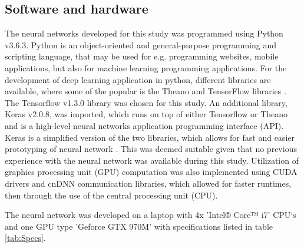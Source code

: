 \subsection{Software and hardware}\label{sec:softHard}
The neural networks developed for this study was programmed using Python v3.6.3. Python is an object-oriented and general-purpose programming and scripting language, that may be used for e.g. programming websites, mobile applications, but also for machine learning programming applications.
For the development of deep learning application in python, different libraries are available, where some of the popular is the Theano and TensorFlow libraries \citep{Swamynathan2017}. The Tensorflow v1.3.0 library was chosen for this study. %
An additional library, Keras v2.0.8, was imported, which runs on top of either Tensorflow or Theano and is a high-level neural networks application programming interface (API).  
Keras is a simplified version of the two libraries, which allows for fast and easier prototyping of neural network \citep{Chollet2015}. This was deemed suitable given that no previous experience with the neural network was available during this study. 
\noindent
Utilization of graphics processing unit (GPU) computation was also implemented using CUDA drivers and cnDNN communication libraries, which allowed for faster runtimes, then through the use of the central processing unit (CPU).

\noindent
The neural network was developed on a laptop with 4x 'Intel® Core™ i7' CPU‘s and one GPU type 'Geforce GTX 970M' with specifications listed in table \ref{tab:Specs}.

